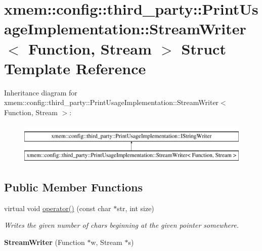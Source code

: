 \hypertarget{structxmem_1_1config_1_1third__party_1_1_print_usage_implementation_1_1_stream_writer}{\section{xmem\-:\-:config\-:\-:third\-\_\-party\-:\-:Print\-Usage\-Implementation\-:\-:Stream\-Writer$<$ Function, Stream $>$ Struct Template Reference}
\label{structxmem_1_1config_1_1third__party_1_1_print_usage_implementation_1_1_stream_writer}
}
Inheritance diagram for xmem\-:\-:config\-:\-:third\-\_\-party\-:\-:Print\-Usage\-Implementation\-:\-:Stream\-Writer$<$ Function, Stream $>$\-:\begin{figure}[H]
\begin{center}
\leavevmode
\includegraphics[height=2.000000cm]{structxmem_1_1config_1_1third__party_1_1_print_usage_implementation_1_1_stream_writer}
\end{center}
\end{figure}
\subsection*{Public Member Functions}
\begin{DoxyCompactItemize}
\item 
\hypertarget{structxmem_1_1config_1_1third__party_1_1_print_usage_implementation_1_1_stream_writer_aa5deaf2391cf05fc97ded29011eb345c}{virtual void \hyperlink{structxmem_1_1config_1_1third__party_1_1_print_usage_implementation_1_1_stream_writer_aa5deaf2391cf05fc97ded29011eb345c}{operator()} (const char $\ast$str, int size)}\label{structxmem_1_1config_1_1third__party_1_1_print_usage_implementation_1_1_stream_writer_aa5deaf2391cf05fc97ded29011eb345c}

\begin{DoxyCompactList}\small\item\em Writes the given number of chars beginning at the given pointer somewhere. \end{DoxyCompactList}\item 
\hypertarget{structxmem_1_1config_1_1third__party_1_1_print_usage_implementation_1_1_stream_writer_ab09e3fe226950f1d06c8e8e0b15ad32c}{{\bfseries Stream\-Writer} (Function $\ast$w, Stream $\ast$s)}\label{structxmem_1_1config_1_1third__party_1_1_print_usage_implementation_1_1_stream_writer_ab09e3fe226950f1d06c8e8e0b15ad32c}

\end{DoxyCompactItemize}
